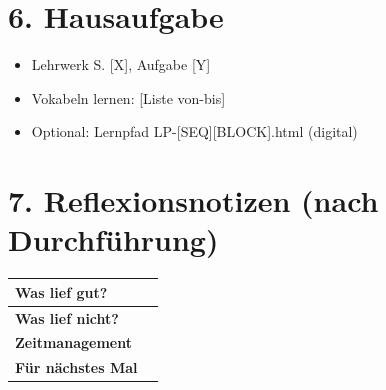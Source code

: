 \documentclass[11pt, a4paper]{article}
\newcommand{\sequenz}{[SEQ]}
\newcommand{\block}{[BLOCK]}
\begin{document}

\section*{6. Hausaufgabe}

\begin{itemize}
    \item Lehrwerk S. [X], Aufgabe [Y]
    \item Vokabeln lernen: [Liste von-bis]
    \item Optional: Lernpfad LP-\sequenz\block.html (digital)
\end{itemize}


\section*{7. Reflexionsnotizen (nach Durchführung)}

\begin{tabularx}{\textwidth}{|l|X|}
\hline
\textbf{Was lief gut?} & \\[2em]
\hline
\textbf{Was lief nicht?} & \\[2em]
\hline
\textbf{Zeitmanagement} & \\[2em]
\hline
\textbf{Für nächstes Mal} & \\[2em]
\hline
\end{tabularx}
\end{document}
